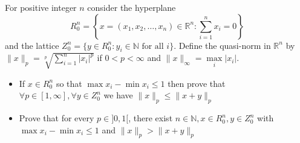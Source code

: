 For positive integer \(n\) consider the hyperplane
\[ R_0^n = \left\{x = (x_1, x_2, \dots, x_n) \in \mathbb{R}^n : \sum_{i=1}^n x_i = 0\right\} \]
and the lattice
\( Z_0^n = \{y \in R_0^n : y_i \in \mathbb{N} \text{ for all } i\} \).
Define the quasi-norm in \(\mathbb{R}^n\) by \(\|x\|_p= \sqrt[p]{\sum^{n}_{i=1}|x_i|^p}\) if \(0<p<\infty\) and \(\|x\|_{\infty} = \max\limits_i |x_i|\).
\begin{itemize}
\item[(a)] If \(x\in R^n_0\) so that \(\max x_i - \min x_i \le 1\) then prove that \(\forall p \in [1,\infty], \forall y \in Z^n_0\) we have \(\|x\|_p\le\|x+y\|_p\)
\item[(b)] Prove that for every \(p\in ]0,1[\), there exist \(n \in \mathbb{N}, x\in R^n_0, y\in Z^n_0\) with \(\max x_i - \min x_i \le 1\) and \(\|x\|_p>\|x+y\|_p\)
\end{itemize}
